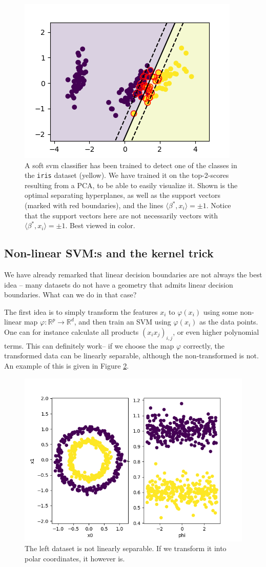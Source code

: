 \documentclass{article}
\newcommand{\sprod}[1]{\langle #1 \rangle}
\newcommand{\R}{\mathbb{R}}
\begin{document}
\begin{figure}
    \centering
    \includegraphics[width=0.5\linewidth]{graphics/svm_classifier_violation.png}
    \caption{A soft svm classifier has been trained to detect one of the classes in the \texttt{iris} dataset (yellow). We have trained it on the top-2-scores resulting from a PCA, to be able to easily visualize it. Shown is the optimal separating hyperplanes, as well as the support vectors (marked with red boundaries), and the lines $\sprod{\beta^*,x_i}=\pm 1$. Notice that the support vectors here are not necessarily vectors with $\sprod{\beta^*,x_i}=\pm 1$. Best viewed in color. }
    \label{fig:svm_soft}
\end{figure}
\subsection{Non-linear SVM:s and the kernel trick}
We have already remarked that linear decision boundaries are not always the best idea -- many datasets do not have a geometry that admits linear decision boundaries. What can we do in that case?

The first idea is to simply transform the features $x_i$ to $\varphi(x_i)$ using some non-linear map $\varphi: \R^p \to \R^d$, and then train an SVM using $\varphi(x_i)$ as the data points. One can for instance calculate all products $(x_ix_j)_{i,j}$, or even higher polynomial terms. This can definitely work-- if we choose the map $\varphi$ correctly, the transformed data can be linearly separable, although the non-transformed is not.  An example of this is given in Figure \ref{fig:polar}.

\begin{figure}
    \centering
    \includegraphics[width=0.5\linewidth]{graphics/polar.png}
    \caption{The left dataset is not linearly separable. If we transform it into polar coordinates, it however is.}
    \label{fig:polar}
\end{figure}
\end{document}
